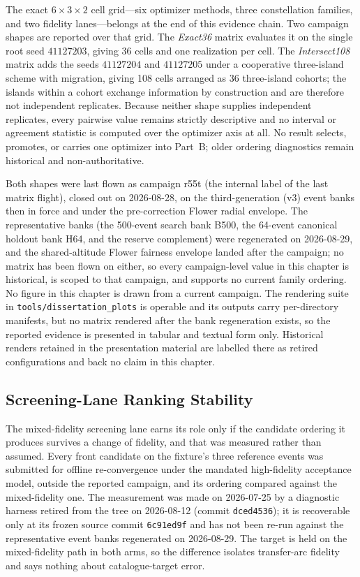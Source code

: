 The exact \(6\times3\times2\) cell grid---six optimizer methods, three constellation families, and two fidelity lanes---belongs at the end of this evidence chain. Two campaign shapes are reported over that grid. The \emph{Exact36} matrix evaluates it on the single root seed \(41127203\), giving 36 cells and one realization per cell. The \emph{Intersect108} matrix adds the seeds \(41127204\) and \(41127205\) under a cooperative three-island scheme with migration, giving 108 cells arranged as 36 three-island cohorts; the islands within a cohort exchange information by construction and are therefore not independent replicates. Because neither shape supplies independent replicates, every pairwise value remains strictly descriptive and no interval or agreement statistic is computed over the optimizer axis at all. No result selects, promotes, or carries one optimizer into Part~B; older ordering diagnostics remain historical and non-authoritative.

Both shapes were last flown as campaign r55t (the internal label of the last matrix flight), closed out on 2026-08-28, on the third-generation (v3) event banks then in force and under the pre-correction Flower radial envelope. The representative banks (the 500-event search bank B500, the 64-event canonical holdout bank H64, and the reserve complement) were regenerated on 2026-08-29, and the shared-altitude Flower fairness envelope landed after the campaign; no matrix has been flown on either, so every campaign-level value in this chapter is historical, is scoped to that campaign, and supports no current family ordering. No figure in this chapter is drawn from a current campaign. The rendering suite in \texttt{tools/dissertation\_plots} is operable and its outputs carry per-directory manifests, but no matrix rendered after the bank regeneration exists, so the reported evidence is presented in tabular and textual form only. Historical renders retained in the presentation material are labelled there as retired configurations and back no claim in this chapter.

\subsection{Screening-Lane Ranking Stability} \label{se:ranking_stability}

The mixed-fidelity screening lane earns its role only if the candidate ordering it produces survives a change of fidelity, and that was measured rather than assumed. Every front candidate on the fixture's three reference events was submitted for offline re-convergence under the mandated high-fidelity acceptance model, outside the reported campaign, and its ordering compared against the mixed-fidelity one. The measurement was made on 2026-07-25 by a diagnostic harness retired from the tree on 2026-08-12 (commit \texttt{dced4536}); it is recoverable only at its frozen source commit \texttt{6c91ed9f} and has not been re-run against the representative event banks regenerated on 2026-08-29. The target is held on the mixed-fidelity path in both arms, so the difference isolates transfer-arc fidelity and says nothing about catalogue-target error.

